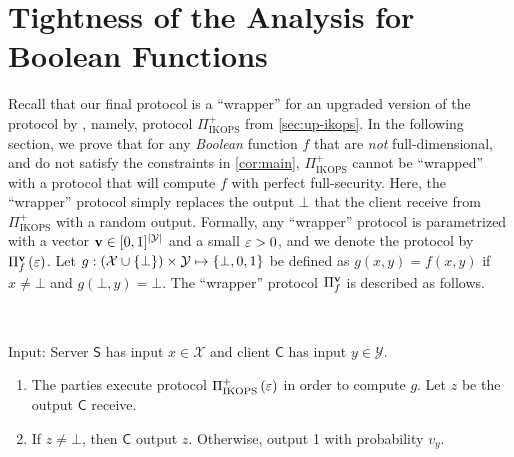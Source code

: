 \documentclass{llncs}
\newcommand{\X}{\mathcal{X}}
\newcommand{\Y}{\mathcal{Y}}
\renewcommand{\v}{\myvec{v}}
\newcommand{\IKOPS}{\operatorname{IKOPS}}
\renewcommand{\Sc}{\mathsf{S}}
\newcommand{\Cc}{\mathsf{C}}
\begin{document}
\section{Tightness of the Analysis for Boolean Functions}\label{sec:limitation}
Recall that our final protocol is a ``wrapper'' for an upgraded version of the protocol by \citet{IKOPS11}, namely, protocol $\Pi_{\IKOPS}^+$ from \cref{sec:up-ikops}. In the following section, we prove that for any \emph{Boolean} function $f$ that are \emph{not} full-dimensional, and do not satisfy the constraints in \cref{cor:main}, $\Pi_{\IKOPS}^+$ cannot be ``wrapped'' with a protocol that will compute $f$ with perfect full-security. Here, the ``wrapper'' protocol simply replaces the output $\bot$ that the client receive from $\Pi_{\IKOPS}^+$ with a random output. Formally, any ``wrapper'' protocol is parametrized with a vector $\v\in[0,1]^{|\Y|}$ and a small $\varepsilon>0$, and we denote the protocol by $\Pi_f^{\v}\of{\eps}$. Let $g:(\X\cup\set{\bot})\times\Y\mapsto\set{\bot,0,1}$ be defined as $g(x,y)=f(x,y)$ if $x\ne\bot$ and $g(\bot,y)=\bot$. The ``wrapper'' protocol $\Pi_f^{\v}$ is described as follows.



\begin{protocol}[$\Pi_f^{\v}\of{\eps}$]\label{prot-gen-comb}~

Input: Server $\Sc$ has input $x\in\X$ and client $\Cc$ has input $y\in\Y$.

\begin{enumerate}
	\item The parties execute protocol $\Pi_{\IKOPS}^+\of{\eps}$ in order to compute $g$. Let $z$ be the output $\Cc$ receive.

	\item If $z\ne\bot$, then $\Cc$ output $z$. Otherwise, output 1 with probability $v_{y}$.
\end{enumerate}
\end{protocol}
\end{document}
